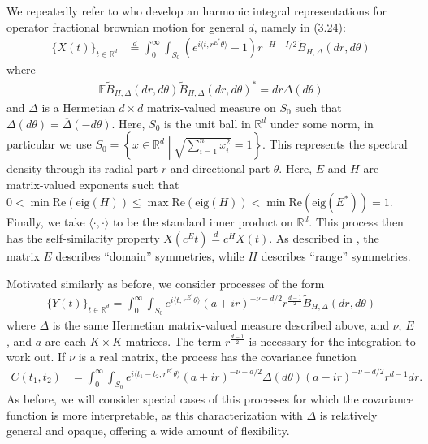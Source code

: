 \documentclass[11pt]{article}
\begin{document}
We repeatedly refer to \cite{didier_domain_2018} who develop an harmonic integral representations for operator fractional brownian motion for general $d$, namely in (3.24): \begin{align*}
\{X(t)\}_{t\in \mathbb{R}^d}&\overset{d}{=} \int_0^\infty \int_{S_0} (e^{i\langle t, r^{E^*}\theta\rangle} - 1)r^{-H - I/2}\tilde{B}_{H, \Delta}(dr, d\theta)
\end{align*}where \begin{align*}
\mathbb{E}\tilde{B}_{H, \Delta}(dr, d\theta)\tilde{B}_{H, \Delta}(dr, d\theta)^* = dr \Delta(d\theta)
\end{align*}and $\Delta$ is a Hermetian $d \times d$ matrix-valued measure on $S_0$ such that $\Delta(d\theta) = \overline{\Delta}(-d\theta)$. Here, $S_0$ is the unit ball in $\mathbb{R}^d$ under some norm, in particular we use $S_0 =\left \{x \in \mathbb{R}^d \middle\vert \sqrt{\sum_{i=1}^n x_i^2} = 1\right\}$. This represents the spectral density through its radial part $r$ and directional part $\theta$. Here, $E$ and $H$ are matrix-valued exponents such that $0 < \min \textrm{Re}(\textrm{eig}(H)) \leq \max \textrm{Re}(\textrm{eig}(H)) < \min \textrm{Re}(\textrm{eig}(E^*)) = 1$. Finally, we take $\langle \cdot,\cdot\rangle$ to be the standard inner product on $\mathbb{R}^d$. This process then has the self-similarity property $X(c^E t) \overset{d}{=} c^HX(t)$. As described in \cite{didier_domain_2018}, the matrix $E$ describes ``domain'' symmetries, while $H$ describes ``range'' symmetries.


Motivated similarly as before, we consider processes of the form\begin{align*}
\{Y(t)\}_{t \in \mathbb{R}^d} = \int_0^\infty \int_{S_0} e^{i \langle t, r^{E^*}\theta\rangle} (a + ir)^{-\nu-d/2} r^{\frac{d-1}{2}}\tilde{B}_{H, \Delta}(dr, d\theta)
\end{align*}where $\Delta$ is the same Hermetian matrix-valued measure described above, and $\nu$, $E$, and $a$ are each $K\times K$ matrices.
The term $r^{\frac{d-1}{2}}$ is necessary for the integration to work out. 
If $\nu$ is a real matrix, the process has the covariance function \begin{align*}
C(t_1, t_2)&=\int_0^\infty \int_{S_0} e^{i\langle t_1 - t_2, r^{E^*}\theta\rangle}(a + ir)^{-\nu-d/2}\Delta(d\theta)(a - ir)^{-\nu-d/2} r^{d-1} dr.
\end{align*}
As before, we will consider special cases of this processes for which the covariance function is more interpretable, as this characterization with $\Delta$ is relatively general and opaque, offering a wide amount of flexibility.
\end{document}
